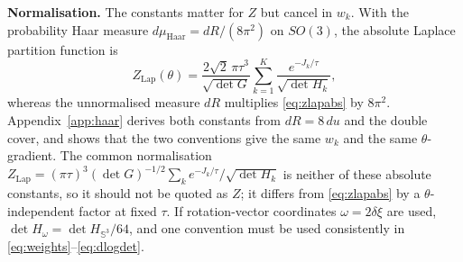 \textbf{Normalisation.} The constants matter for $Z$ but cancel in $w_k$. With the probability Haar measure $d\mu_{\mathrm{Haar}}=dR/(8\pi^2)$ on $SO(3)$, the absolute Laplace partition function is
\begin{equation}
Z_{\mathrm{Lap}}(\theta)=\frac{2\sqrt2\,\pi\tau^3}{\sqrt{\det G}}\sum_{k=1}^K\frac{e^{-J_k/\tau}}{\sqrt{\det H_k}},
\label{eq:zlapabs}
\end{equation}
whereas the unnormalised measure $dR$ multiplies \eqref{eq:zlapabs} by $8\pi^2$. Appendix~\ref{app:haar} derives both constants from $dR=8\,du$ and the double cover, and shows that the two conventions give the same $w_k$ and the same $\theta$-gradient. The common normalisation $Z_{\mathrm{Lap}}=(\pi\tau)^3(\det G)^{-1/2}\sum_ke^{-J_k/\tau}/\sqrt{\det H_k}$ is neither of these absolute constants, so it should not be quoted as $Z$; it differs from \eqref{eq:zlapabs} by a $\theta$-independent factor at fixed $\tau$. If rotation-vector coordinates $\omega=2\delta\xi$ are used, $\det H_\omega=\det H_{\mathbb{S}^3}/64$, and one convention must be used consistently in \eqref{eq:weights}--\eqref{eq:dlogdet}.

